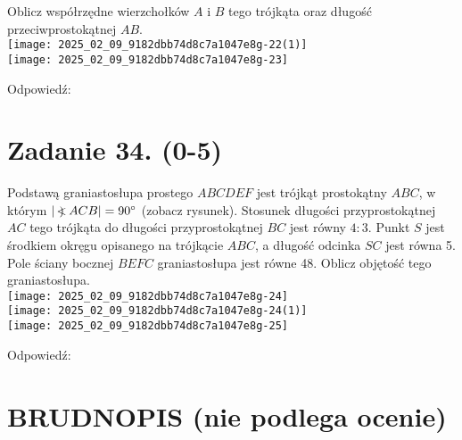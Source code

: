 \documentclass[10pt]{article}
\newcommand\Varangle{\mathop{{<\!\!\!\!\!\text{\small)}}\:}\nolimits}
\begin{document}
Oblicz współrzędne wierzchołków \(A\) i \(B\) tego trójkąta oraz długość przeciwprostokątnej \(A B\).\\
\texttt{[image: 2025\_02\_09\_9182dbb74d8c7a1047e8g-22(1)]}\\
\texttt{[image: 2025\_02\_09\_9182dbb74d8c7a1047e8g-23]}

Odpowiedź:

\section*{Zadanie 34. (0-5)}
Podstawą graniastosłupa prostego \(A B C D E F\) jest trójkąt prostokątny \(A B C\), w którym \(|\Varangle A C B|=90^{\circ}\) (zobacz rysunek). Stosunek długości przyprostokątnej \(A C\) tego trójkąta do długości przyprostokątnej \(B C\) jest równy \(4: 3\). Punkt \(S\) jest środkiem okręgu opisanego na trójkącie \(A B C\), a długość odcinka \(S C\) jest równa 5. Pole ściany bocznej \(B E F C\) graniastosłupa jest równe 48. Oblicz objętość tego graniastosłupa.\\
\texttt{[image: 2025\_02\_09\_9182dbb74d8c7a1047e8g-24]}\\
\texttt{[image: 2025\_02\_09\_9182dbb74d8c7a1047e8g-24(1)]}\\
\texttt{[image: 2025\_02\_09\_9182dbb74d8c7a1047e8g-25]}

Odpowiedź:

\section*{BRUDNOPIS (nie podlega ocenie)}
\end{document}

